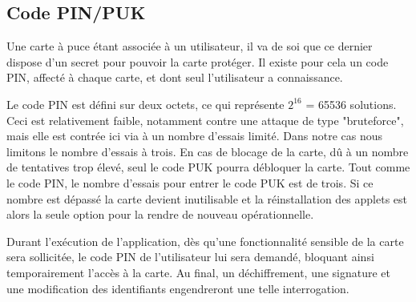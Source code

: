 \documentclass[a4paper,11pt,french]{article}
\begin{document}
\subsection{Code PIN/PUK}
Une carte à puce étant associée à un utilisateur, il va de soi que ce dernier 
dispose d'un secret pour pouvoir la carte protéger. Il existe pour cela un code 
PIN, affecté à chaque carte, et dont seul l'utilisateur a connaissance.

Le code PIN est défini sur deux octets, ce qui représente $2^{16}$ = 65536 solutions.
Ceci est relativement faible, notamment contre une attaque de type 
"bruteforce", mais elle est contrée ici via à un nombre d'essais limité.
Dans notre cas nous limitons le nombre d'essais à trois. En cas de blocage de la
carte, dû à un nombre de tentatives trop élevé, seul le code PUK pourra 
débloquer la carte. Tout comme le code PIN, le nombre d'essais pour entrer le 
code PUK est de trois. Si ce nombre est dépassé la carte devient inutilisable et
la réinstallation des applets est alors la seule option pour la rendre
de nouveau opérationnelle.

Durant l'exécution de l'application, dès qu'une fonctionnalité sensible de la 
carte sera sollicitée, le code PIN de l'utilisateur lui sera demandé, bloquant 
ainsi temporairement l'accès à la carte. Au final, un déchiffrement, une signature
et une modification des identifiants engendreront une telle interrogation.
\end{document}
